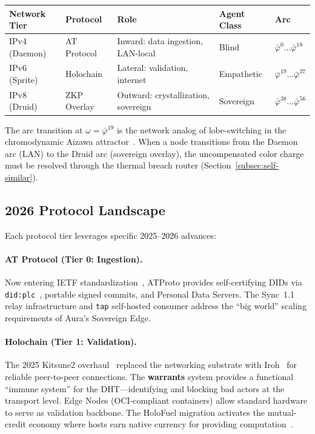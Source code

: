 \documentclass[12pt,a4paper]{article}
\begin{document}
\begin{center}
\small
\begin{tabular}{@{}llp{3.5cm}ll@{}}
\toprule
\textbf{Network Tier} & \textbf{Protocol} & \textbf{Role} & \textbf{Agent Class} & \textbf{Arc} \\
\midrule
IPv4 (Daemon) & AT Protocol & Inward: data ingestion, LAN-local & Blind & $\bar{\varphi}^{0} \ldots \bar{\varphi}^{18}$ \\
IPv6 (Sprite) & Holochain   & Lateral: validation, internet     & Empathetic & $\bar{\varphi}^{19} \ldots \bar{\varphi}^{37}$ \\
IPv8 (Druid)  & ZKP Overlay & Outward: crystallization, sovereign & Sovereign & $\bar{\varphi}^{38} \ldots \bar{\varphi}^{56}$ \\
\bottomrule
\end{tabular}
\end{center}

The arc transition at $\omega = \bar{\varphi}^{19}$ is the network analog of lobe-switching in the chromodynamic Aizawa attractor~\cite{PP-I-Ch8}. When a node transitions from the Daemon arc (LAN) to the Druid arc (sovereign overlay), the uncompensated color charge must be resolved through the thermal breach router (Section~\ref{subsec:self-similar}).

\subsection{2026 Protocol Landscape}

Each protocol tier leverages specific 2025--2026 advances:

\paragraph{AT Protocol (Tier 0: Ingestion).} Now entering IETF standardization~\cite{atproto2026ietf}, ATProto provides self-certifying DIDs via \texttt{did:plc}~\cite{atproto2024}, portable signed commits, and Personal Data Servers. The Sync~1.1 relay infrastructure and \texttt{tap} self-hosted consumer address the ``big world'' scaling requirements of Aura's Sovereign Edge.

\paragraph{Holochain (Tier 1: Validation).} The 2025 Kitsune2 overhaul~\cite{holochain2025kitsune} replaced the networking substrate with Iroh~\cite{iroh2024} for reliable peer-to-peer connections. The \textbf{warrants} system provides a functional ``immune system'' for the DHT---identifying and blocking bad actors at the transport level. Edge Nodes (OCI-compliant containers) allow standard hardware to serve as validation backbone. The HoloFuel migration activates the mutual-credit economy where hosts earn native currency for providing computation~\cite{holo2026fuel}.
\end{document}
